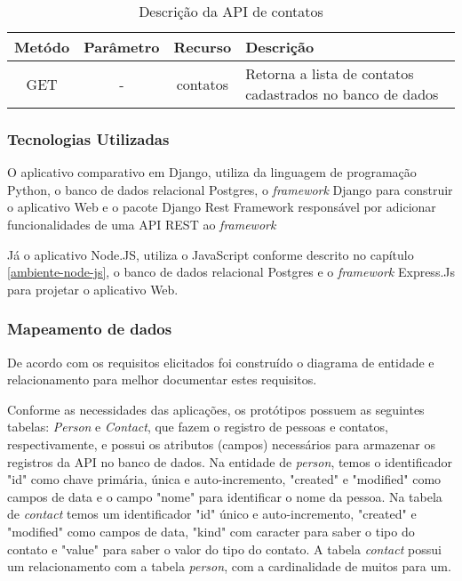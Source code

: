   \begin{table}[H]
    \centering
    \footnotesize
    \vspace{0.5cm}
    \setlength{\abovecaptionskip}{0pt}
    \setlength{\belowcaptionskip}{0pt}
    \caption[Descrição da API de contatos]{Descrição da API de contatos}
    \label{tab:api-descricao-contato}
    \begin{tabular}{c|c|c|p{8cm}}
      \hline \hline
      Metódo  &	Parâmetro &	Recurso &	Descrição \\
      \hline \hline
      GET	& -	& contatos	& Retorna a lista de contatos 
					  cadastrados no banco de dados \\
      \hline \hline
    \end{tabular}
  \end{table}
  
\subsubsection{Tecnologias Utilizadas}


  O aplicativo comparativo em Django, utiliza da linguagem de programação Python, o banco de dados relacional Postgres,
  o \textit{framework} Django para construir o aplicativo Web e o pacote Django Rest Framework responsável por adicionar
  funcionalidades de uma API REST ao \textit{framework}
    
  Já o aplicativo Node.JS, utiliza o JavaScript conforme descrito no capítulo \ref{ambiente-node-js}, o banco de dados
  relacional Postgres e o \textit{framework} Express.Js para projetar o aplicativo Web.
 
\subsubsection{Mapeamento de dados}

  De acordo com os requisitos elicitados foi construído o diagrama de entidade e relacionamento para melhor
  documentar estes requisitos.

  Conforme as necessidades das aplicações, os protótipos possuem as seguintes tabelas: \textit{Person} e \textit{Contact},
  que fazem o registro de pessoas e contatos, respectivamente, e possui os atributos (campos) necessários
  para armazenar os registros da API no banco de dados. Na entidade de \textit{person}, temos o identificador
  "id" como chave primária, única e auto-incremento, "created" e "modified" como campos de data e o campo
  "nome" para identificar o nome da pessoa. Na tabela de \textit{contact} temos um identificador "id" único e auto-incremento,
  "created" e "modified" como campos de data, "kind" com caracter para saber o tipo do contato e "value" para 
  saber o valor do tipo do contato. A tabela \textit{contact} possui um relacionamento com a tabela \textit{person},
  com a cardinalidade de muitos para um.

